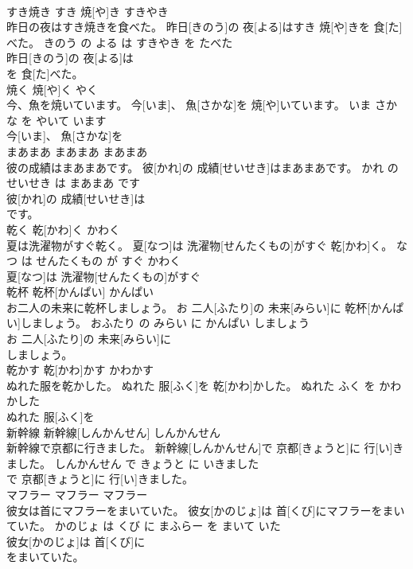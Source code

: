 \documentclass[8pt]{extreport}
\begin{document}
\begin{CJK}{UTF8}{min}
\\	すき焼き	すき 焼[や]き	すきやき	
\\	昨日の夜はすき焼きを食べた。	昨日[きのう]の 夜[よる]はすき 焼[や]きを 食[た]べた。	きのう の よる は すきやき を たべた	
\\	昨日[きのう]の 夜[よる]は
\\	を 食[た]べた。			
\\	焼く	焼[や]く	やく	
\\	今、魚を焼いています。	今[いま]、 魚[さかな]を 焼[や]いています。	いま さかな を やいて います	
\\	今[いま]、 魚[さかな]を
\\	まあまあ	まあまあ	まあまあ	
\\	彼の成績はまあまあです。	彼[かれ]の 成績[せいせき]はまあまあです。	かれ の せいせき は まあまあ です	
\\	彼[かれ]の 成績[せいせき]は
\\	です。			
\\	乾く	乾[かわ]く	かわく	
\\	夏は洗濯物がすぐ乾く。	夏[なつ]は 洗濯物[せんたくもの]がすぐ 乾[かわ]く。	なつ は せんたくもの が すぐ かわく	
\\	夏[なつ]は 洗濯物[せんたくもの]がすぐ
\\	乾杯	乾杯[かんぱい]	かんぱい	
\\	お二人の未来に乾杯しましょう。	お 二人[ふたり]の 未来[みらい]に 乾杯[かんぱい]しましょう。	おふたり の みらい に かんぱい しましょう	
\\	お 二人[ふたり]の 未来[みらい]に
\\	しましょう。			
\\	乾かす	乾[かわ]かす	かわかす	
\\	ぬれた服を乾かした。	ぬれた 服[ふく]を 乾[かわ]かした。	ぬれた ふく を かわかした	
\\	ぬれた 服[ふく]を
\\	新幹線	新幹線[しんかんせん]	しんかんせん	
\\	新幹線で京都に行きました。	新幹線[しんかんせん]で 京都[きょうと]に 行[い]きました。	しんかんせん で きょうと に いきました	
\\	で 京都[きょうと]に 行[い]きました。			
\\	マフラー	マフラー	マフラー	
\\	彼女は首にマフラーをまいていた。	彼女[かのじょ]は 首[くび]にマフラーをまいていた。	かのじょ は くび に まふらー を まいて いた	
\\	彼女[かのじょ]は 首[くび]に
\\	をまいていた。			

\end{CJK}
\end{document}
